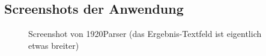 \subsection{Screenshots der Anwendung}
\label{Screenshots}
\begin{figure}[htb]
\centering
{}
\caption{Screenshot von 1920Parser (das Ergebnis-Textfeld ist eigentlich etwas breiter)}
\end{figure}
\clearpage
